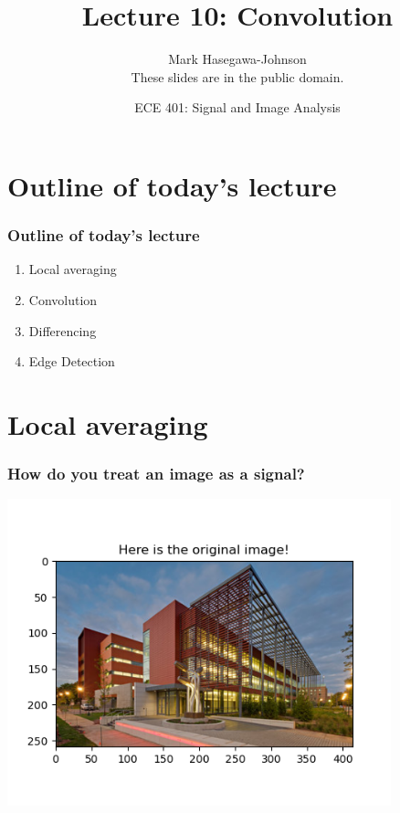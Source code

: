 \documentclass{beamer}
\title{Lecture 10: Convolution}
\author{Mark Hasegawa-Johnson\\These slides are in the public domain.}
\date{ECE 401: Signal and Image Analysis}
\begin{document}
\begin{frame}
  \maketitle
\end{frame}

\begin{frame}
  \tableofcontents
\end{frame}

\section[Outline]{Outline of today's lecture}
\setcounter{subsection}{1}
\begin{frame}
  \frametitle{Outline of today's lecture}
  \begin{enumerate}
  \item Local averaging
  \item Convolution
  \item Differencing
  \item Edge Detection
  \end{enumerate}
\end{frame}

\section[Averaging]{Local averaging}
\setcounter{subsection}{1}

\begin{frame}
  \frametitle{How do you treat an image as a signal?}
  \centerline{\includegraphics[height=3.5in]{mp3fig1.png}}
\end{frame}
\end{document}
